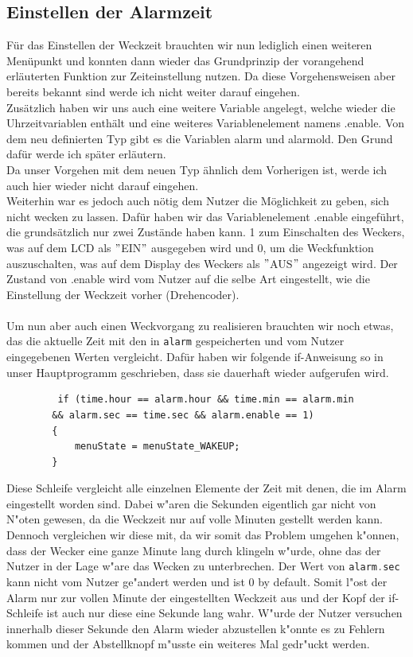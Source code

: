 \documentclass[openright,twoside,11pt,a4paper]{scrartcl}
\begin{document}
\begin{flushleft}
	 	\subsection{Einstellen der Alarmzeit}
		 Für das Einstellen der Weckzeit brauchten wir nun lediglich einen weiteren Menüpunkt und konnten dann wieder das Grundprinzip der vorangehend erläuterten Funktion zur Zeiteinstellung nutzen. Da diese Vorgehensweisen aber bereits bekannt sind werde ich nicht weiter darauf eingehen.\\
		 Zusätzlich haben wir uns auch eine weitere Variable angelegt, welche wieder die Uhrzeitvariablen enthält und eine weiteres Variablenelement namens .enable. Von dem neu definierten Typ gibt es die Variablen alarm und alarmold. Den Grund dafür werde ich später erläutern. \\
		 Da unser Vorgehen mit dem neuen Typ ähnlich dem Vorherigen ist, werde ich auch hier wieder nicht darauf eingehen.\\
	 	Weiterhin war es jedoch auch nötig dem Nutzer die Möglichkeit zu geben, sich nicht wecken zu lassen. Dafür haben wir das Variablenelement .enable eingeführt, die grundsätzlich nur zwei Zustände haben kann. 1 zum Einschalten des Weckers, was auf dem LCD als $"$EIN$"$ ausgegeben wird und 0, um die Weckfunktion auszuschalten, was auf dem Display des Weckers als $"$AUS$"$ angezeigt wird. Der Zustand von .enable wird vom Nutzer auf die selbe Art eingestellt, wie die Einstellung der Weckzeit vorher (Drehencoder). \\
	 	\ \\
	 	Um nun aber auch einen Weckvorgang zu realisieren brauchten wir noch etwas, das die aktuelle Zeit mit den in \lstinline[language=c++]|alarm| gespeicherten und vom Nutzer eingegebenen Werten vergleicht. Dafür haben wir folgende if-Anweisung so in unser Hauptprogramm geschrieben, dass sie dauerhaft wieder aufgerufen wird.
	 	\begin{lstlisting}
	 	 if (time.hour == alarm.hour && time.min == alarm.min
	 	&& alarm.sec == time.sec && alarm.enable == 1)
	 	{ 
	 		menuState = menuState_WAKEUP;
	 	}
	 	\end{lstlisting}
	 	Diese Schleife vergleicht alle einzelnen Elemente der Zeit mit denen, die im Alarm eingestellt worden sind. Dabei w"aren die Sekunden eigentlich gar nicht von N"oten gewesen, da die Weckzeit nur auf volle Minuten gestellt werden kann. Dennoch vergleichen wir diese mit, da wir somit das Problem umgehen k"onnen, dass der Wecker eine ganze Minute lang durch klingeln w"urde, ohne das der Nutzer in der Lage w"are das Wecken zu unterbrechen. Der Wert von \lstinline[language=c++]|alarm.sec| kann nicht vom Nutzer ge"andert werden und ist 0 by default. Somit l"ost der Alarm nur zur vollen Minute der eingestellten Weckzeit aus und der Kopf der if-Schleife ist auch nur diese eine Sekunde lang wahr. W"urde der Nutzer versuchen innerhalb dieser Sekunde den Alarm wieder abzustellen k"onnte es zu Fehlern kommen und der Abstellknopf m"usste ein weiteres Mal gedr"uckt werden.\\

\end{flushleft}
\end{document}
